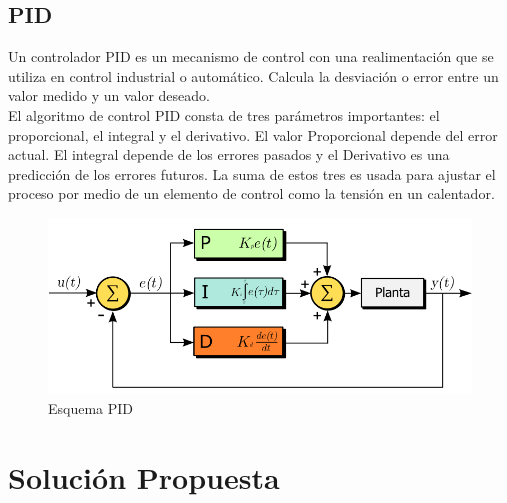 \documentclass[letterpaper]{article}
\begin{document}
\subsection{PID}
 Un controlador PID es un mecanismo de control con una realimentación que se utiliza en control industrial o automático. Calcula la desviación o error entre un valor medido y un valor deseado.\\
 El algoritmo de control PID consta de tres parámetros importantes: el proporcional, el integral y el derivativo. El valor Proporcional depende del error actual. El integral depende de los errores pasados y el Derivativo es una predicción de los errores futuros. La suma de estos tres es usada para ajustar el proceso por medio de un elemento de control como la tensión en un calentador.\cite{1}\\

\begin{figure}[hbtp]
\centering
\includegraphics[width=10 cm]{PID.png}
\caption{Esquema PID}
\label{PID}
\end{figure}



\newpage
\section{Solución Propuesta}
\end{document}
